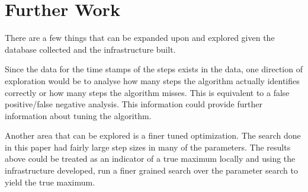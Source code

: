     \chapter{Further Work}

        There are a few things that can be expanded upon and explored given the database collected and the infrastructure built. 

        Since the data for the time stamps of the steps exists in the data, one direction of exploration would be to analyse how many steps the algorithm actually identifies correctly or how many steps the algorithm misses. This is equivalent to a false positive/false negative analysis. This information could provide further information about tuning the algorithm. 

        Another area that can be explored is a finer tuned optimization. The search done in this paper had fairly large step sizes in many of the parameters. The results above could be treated as an indicator of a true maximum locally and using the infrastructure developed, run a finer grained search over the parameter search to yield the true maximum.